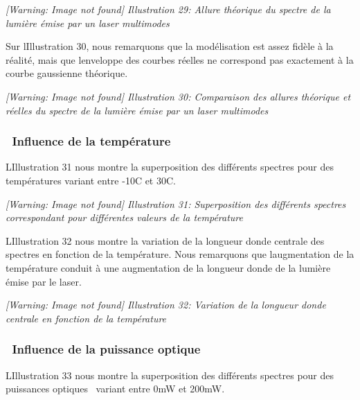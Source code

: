 \documentclass[12pt,twoside]{article}
\begin{document}
\begin{minipage}{15.334cm}
{\itshape
 [Warning: Image not found] Illustration
29\label{seq:refIllustration28}: Allure th\'eorique du spectre de la
lumi\`ere \'emise par un laser multimodes}
\end{minipage}

Sur l{\textquotesingle}Illustration 30, nous remarquons que la
mod\'elisation est assez fid\`ele \`a la r\'ealit\'e, mais que
l{\textquotesingle}enveloppe des courbes r\'eelles ne correspond pas
exactement \`a la courbe gaussienne th\'eorique.

\begin{minipage}{15.334cm}
{\itshape
 [Warning: Image not found] Illustration
30\label{seq:refIllustration29}: Comparaison des allures th\'eorique et
r\'eelles du spectre de la lumi\`ere \'emise par un laser multimodes}
\end{minipage}

\subsubsection[\ Influence de la temp\'erature]{\ Influence de la
temp\'erature}
L{\textquotesingle}Illustration 31 nous montre la superposition des
diff\'erents spectres pour des temp\'eratures variant entre
{}-10{\textdegree}C et 30{\textdegree}C.

\begin{minipage}{15.334cm}
{\itshape
 [Warning: Image not found] Illustration
31\label{seq:refIllustration30}: Superposition des diff\'erents
spectres correspondant pour diff\'erentes valeurs de la temp\'erature}
\end{minipage}

L{\textquotesingle}Illustration 32 nous montre la variation de la
longueur d{\textquotesingle}onde centrale des spectres en fonction de
la temp\'erature. Nous remarquons que l{\textquotesingle}augmentation
de la temp\'erature conduit \`a une augmentation de la longueur
d{\textquotesingle}onde de la lumi\`ere \'emise par le laser.

\begin{minipage}{15.334cm}
{\itshape
 [Warning: Image not found] Illustration
32\label{seq:refIllustration31}: Variation de la longueur
d{\textquotesingle}onde centrale en fonction de la temp\'erature}
\end{minipage}

\subsubsection[\ Influence de la puissance optique]{\ Influence de la
puissance optique}
L{\textquotesingle}Illustration 33 nous montre la superposition des
diff\'erents spectres pour des puissances optiques \ variant entre 0mW
et 200mW.
\end{document}
